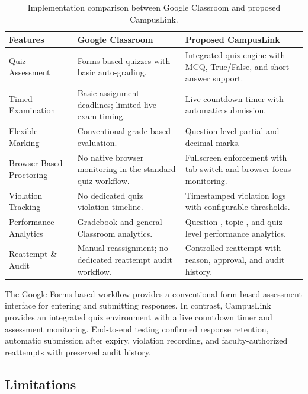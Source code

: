 \documentclass[conference]{IEEEtran}
\begin{document}
\begin{table}[!t]
\caption{Implementation comparison between Google Classroom and proposed CampusLink.}
\label{tab:platform-comparison}
\centering
\scriptsize
\renewcommand{\arraystretch}{1.08}
\begin{tabular}{|p{1.45cm}|p{2.55cm}|p{2.55cm}|}
\hline
\textbf{Features} & \textbf{Google Classroom} & \textbf{Proposed CampusLink} \\
\hline
Quiz Assessment &
Forms-based quizzes with basic auto-grading. &
Integrated quiz engine with MCQ, True/False, and short-answer support. \\
\hline
Timed Examination &
Basic assignment deadlines; limited live exam timing. &
Live countdown timer with automatic submission. \\
\hline
Flexible Marking &
Conventional grade-based evaluation. &
Question-level partial and decimal marks. \\
\hline
Browser-Based Proctoring &
No native browser monitoring in the standard quiz workflow. &
Fullscreen enforcement with tab-switch and browser-focus monitoring. \\
\hline
Violation Tracking &
No dedicated quiz violation timeline. &
Timestamped violation logs with configurable thresholds. \\
\hline
Performance Analytics &
Gradebook and general Classroom analytics. &
Question-, topic-, and quiz-level performance analytics. \\
\hline
Reattempt \& Audit &
Manual reassignment; no dedicated reattempt audit workflow. &
Controlled reattempt with reason, approval, and audit history. \\
\hline
\end{tabular}
\end{table}

The Google Forms-based workflow provides a conventional form-based assessment interface for entering and submitting responses. In contrast, CampusLink provides an integrated quiz environment with a live countdown timer and assessment monitoring. End-to-end testing confirmed response retention, automatic submission after expiry, violation recording, and faculty-authorized reattempts with preserved audit history.

\subsection{Limitations}
\label{sec:limits}
\end{document}
